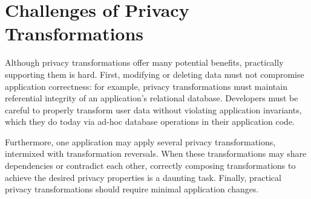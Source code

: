 \section{Challenges of Privacy Transformations}
\label{sec:survey}
%

Although privacy transformations offer many potential benefits, practically supporting them is hard.
First, modifying or deleting data must not compromise application correctness: for example, privacy
transformations must maintain referential integrity of an application's relational database.
Developers must be careful to properly transform user data without violating application invariants,
which they do today via ad-hoc database operations in their application code.
%

Furthermore, one application may apply several privacy transformations, intermixed with
transformation reversals.  When these transformations may share dependencies or contradict each
other, correctly composing transformations to achieve the desired privacy properties is a daunting
task.
%
Finally, practical privacy transformations should require minimal application changes.
%

